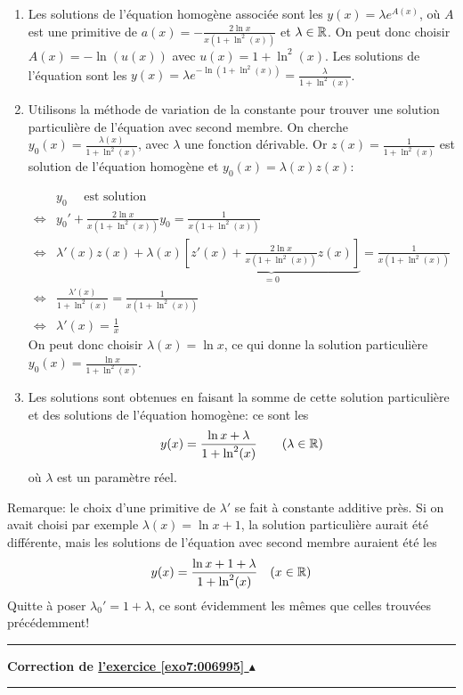 \documentclass[11pt,a4paper]{article}
\newcounter{exo}
\newcommand{\correction}[1]{\hypertarget{cor7:#1}{}\label{cor7:#1}{\bf Correction de \hyperlink{exo7:#1}{l'exercice \ref{exo7:#1} $\blacktriangle$}}\vspace{1mm}\hrule\vspace{1mm}}
\newcommand{\fincorrection}{\vspace{1mm}\hrule\vspace*{7mm}}
\begin{document}
\begin{enumerate}
\begin{enumerate}
    \item Les solutions de l'équation homogène associée sont les $y(x)=\lambda e^{A(x)}$, 
    où $A$ est une primitive de $a(x)=-\frac{2\ln x}{x(1+\ln^2(x))}$ et $\lambda\in\mathbb{R}$. 
    On peut donc choisir $A(x)=-\ln(u(x))$ avec $u(x)=1+\ln^2(x)$. Les solutions 
    de l'équation sont les $\displaystyle y(x)=\lambda e^{-\ln(1+\ln^2(x))}=\frac{\lambda}{1+\ln^2(x)}$.
    
    \item Utilisons la méthode de variation de la constante pour trouver une solution 
    particulière de l'équation avec second membre. On cherche $y_0(x)=\frac{\lambda(x)}{1+\ln^2(x)}$, 
    avec $\lambda$ une fonction dérivable. Or $z(x)=\frac{1}{1+\ln^2(x)}$ est solution 
    de l'équation homogène et $y_0(x)=\lambda(x)z(x)$:
    
    \begin{align*}
          & y_0 \quad \text{ est  solution} \\
    \iff&  y_0'+\frac{2\ln x}{x(1+\ln^2(x))}y_0  =  \frac{1}{x(1+\ln^2(x))}\\
    \iff& \lambda'(x)z(x)+\lambda(x)\underbrace{\left[z'(x)+\frac{2\ln x}{x(1+\ln^2(x))}z(x)\right]}_{=0} = \frac{1}{x(1+\ln^2(x))} \\
    \iff& \frac{\lambda'(x)}{1+\ln^2(x)} = \frac{1}{x(1+\ln^2(x))}\\
    \iff& \lambda'(x)=\frac{1}{x}
    \end{align*}    
    On peut donc choisir $\lambda(x)=\ln x$, ce qui donne la solution particulière 
$y_0(x)=\frac{\ln x}{1+\ln^2(x)}$.
     

    \item Les solutions sont obtenues en faisant la somme de cette solution particulière et 
    des solutions de l'équation homogène: ce sont les 
$$y(x)=\frac{\ln x +\lambda}{1+\ln^2(x)}\qquad (\lambda\in\mathbb{R})$$
où $\lambda$ est un paramètre réel.
  \end{enumerate}
Remarque: le choix d'une primitive de $\lambda'$ se fait à constante additive près. 
Si on avait choisi par exemple $\lambda(x)=\ln x + 1$, la solution particulière aurait été différente, mais les solutions de l'équation avec second membre auraient été les 
$$y(x)=\frac{\ln x +1+\lambda}{1+\ln^2(x)}\quad (x\in\mathbb{R})$$
Quitte à poser $\lambda_0'=1+\lambda$, ce sont évidemment les m\^emes que celles trouvées précédemment!
\end{enumerate}
\fincorrection
\correction{006995}\ 
\end{document}
